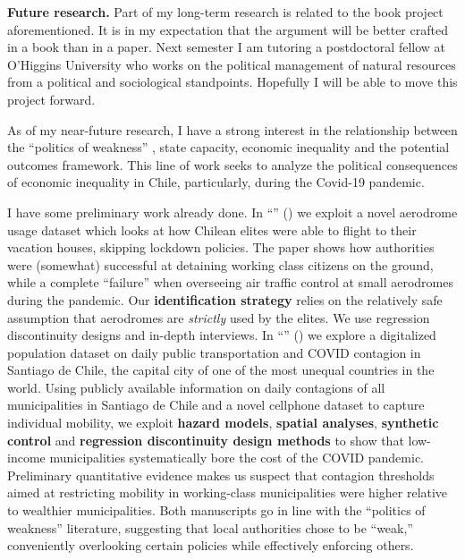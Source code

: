 \documentclass[10pt,stdletter,dateno,sigleft]{newlfm} %
\begin{document}
\begin{newlfm}
{\bf Future research.} Part of my long-term research is related to the book project aforementioned. It is in my expectation that the argument will be better crafted in a book than in a paper. Next semester I am tutoring a postdoctoral fellow at O'Higgins University who works on the political management of natural resources from a political and sociological standpoints. Hopefully I will be able to move this project forward. 

As of my near-future research, I have a strong interest in the relationship between the ``politics of weakness'' \parencite{Brinks2020}, state capacity, economic inequality and the potential outcomes framework. This line of work seeks to analyze the political consequences of economic inequality in Chile, particularly, during the Covid-19 pandemic. 

I have some preliminary work already done. In ``\href{https://raw.githubusercontent.com/hbahamonde/Tobalaba/master/abstract.txt}{{\unskip}}'' (\emph{\unskip}) we exploit a novel aerodrome usage dataset which looks at how Chilean elites were able to flight to their vacation houses, skipping lockdown policies. The paper shows how authorities were (somewhat) successful at detaining working class citizens on the ground, while a complete ``failure'' when overseeing air traffic control at small aerodromes during the pandemic. Our {\bf identification strategy} relies on the relatively safe assumption that aerodromes are \emph{strictly} used by the elites. We use regression discontinuity designs and in-depth interviews. In ``\href{https://github.com/hbahamonde/Bus/raw/main/abstract.txt}{{\unskip}}'' (\emph{\unskip})  we explore a digitalized population dataset on daily public transportation and COVID contagion in Santiago de Chile, the capital city of one of the most unequal countries in the world. Using publicly available information on daily contagions of all municipalities in Santiago de Chile and a novel cellphone dataset to capture individual mobility, we exploit {\bf hazard models}, {\bf spatial analyses}, {\bf synthetic control} and {\bf regression discontinuity design methods} to show that low-income municipalities systematically bore the cost of the COVID pandemic. Preliminary quantitative evidence makes us suspect that contagion thresholds aimed at restricting mobility in working-class municipalities were higher relative to wealthier municipalities. Both manuscripts go in line with the ``politics of weakness'' literature, suggesting that local authorities chose to be ``weak,'' conveniently overlooking certain policies while effectively enforcing others.


\end{newlfm}
\end{document}
